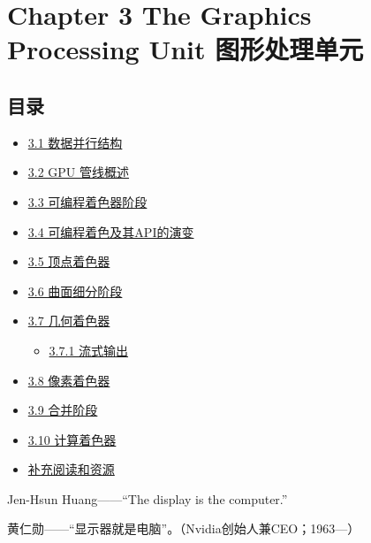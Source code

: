 \documentclass[
  paper=a4,
  ,captions=tableheading
]{scrartcl}
\author{}
\date{}
\title{}
\author{}
\date{}
\providecommand{\tightlist}{%
  \setlength{\itemsep}{0pt}\setlength{\parskip}{0pt}}
\renewenvironment{quote}{\begin{customblockquote}\list{}{\rightmargin=0em\leftmargin=0em}%
\item\relax\color{blockquote-text}\ignorespaces}{\unskip\unskip\endlist\end{customblockquote}}
\begin{document}
\section{Chapter 3 The Graphics Processing Unit
图形处理单元}\label{chapter-3-the-graphics-processing-unit-ux56feux5f62ux5904ux7406ux5355ux5143}

\subsection{目录}\label{ux76eeux5f55}

\begin{itemize}
\tightlist
\item
  \hyperref[31-ux6570ux636eux5e76ux884cux7ed3ux6784]{3.1 数据并行结构}
\item
  \hyperref[32-GPU-ux7ba1ux7ebfux6982ux8ff0]{3.2 GPU 管线概述}
\item
  \hyperref[33-ux53efux7f16ux7a0bux7740ux8272ux5668ux9636ux6bb5]{3.3
  可编程着色器阶段}
\item
  \hyperref[34-ux53efux7f16ux7a0bux7740ux8272ux53caux5176APIux7684ux6f14ux53d8]{3.4
  可编程着色及其API的演变}
\item
  \hyperref[35-ux9876ux70b9ux7740ux8272ux5668]{3.5 顶点着色器}
\item
  \hyperref[36-ux66f2ux9762ux7ec6ux5206ux9636ux6bb5]{3.6 曲面细分阶段}
\item
  \hyperref[37-ux51e0ux4f55ux7740ux8272ux5668]{3.7 几何着色器}

  \begin{itemize}
  \tightlist
  \item
    \hyperref[371-ux6d41ux5f0fux8f93ux51fa]{3.7.1 流式输出}
  \end{itemize}
\item
  \hyperref[38-ux50cfux7d20ux7740ux8272ux5668]{3.8 像素着色器}
\item
  \hyperref[39-ux5408ux5e76ux9636ux6bb5]{3.9 合并阶段}
\item
  \hyperref[310-ux8ba1ux7b97ux7740ux8272ux5668]{3.10 计算着色器}
\item
  \hyperref[ux8865ux5145ux9605ux8bfbux548cux8d44ux6e90]{补充阅读和资源}
\end{itemize}

\begin{quote}
Jen-Hsun Huang------``The display is the computer.''
\end{quote}

\begin{quote}
黄仁勋------``显示器就是电脑''。（Nvidia创始人兼CEO；1963---）
\end{quote}
\end{document}
